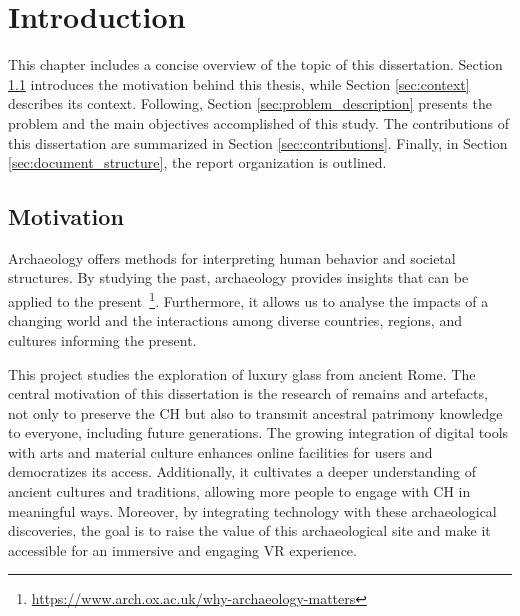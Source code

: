 
%

\chapter{Introduction}
\label{cha:introduction}

This chapter includes a concise overview of the topic of this dissertation. 
Section \ref{sec:motivation} introduces the motivation behind this thesis, while Section \ref{sec:context} describes its context.
Following, Section \ref{sec:problem_description} presents the problem and the main objectives accomplished of this study. 
The contributions of this dissertation are summarized in Section \ref{sec:contributions}.
Finally, in Section \ref{sec:document_structure}, the report organization is outlined.

\section{Motivation}
\label{sec:motivation}
Archaeology offers methods for interpreting human behavior and societal structures. By studying the past, archaeology provides insights that can be applied to the present~\footnote{\url{https://www.arch.ox.ac.uk/why-archaeology-matters}}.
Furthermore, it allows us to analyse the impacts of a changing world and the interactions among diverse countries, regions, and cultures informing the present.

This project studies the exploration of luxury glass from ancient Rome.
The central motivation of this dissertation is the research of remains and artefacts, not
only to preserve the \gls{CH} but also to transmit ancestral patrimony knowledge to everyone, including future generations. 
The growing integration of digital tools with arts and material culture enhances online 
facilities for users and democratizes its access. Additionally, it cultivates a deeper understanding of ancient cultures and traditions, allowing more people to engage with
\gls{CH} in meaningful ways. Moreover, by integrating technology with these archaeological 
discoveries, the goal is to raise the value of this archaeological site and make it accessible for an immersive and engaging \gls{VR} experience.


